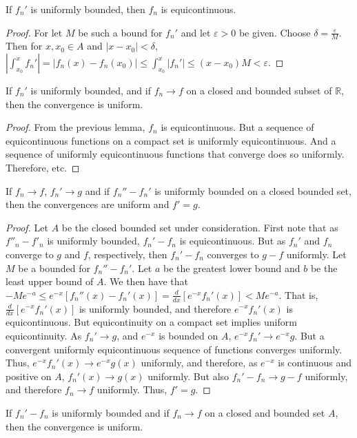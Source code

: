 \documentclass[crop=false,class=book]{standalone}
\begin{document}
\begin{lemma}
If $f_n'$ is uniformly bounded, then $f_n$ is equicontinuous.
\end{lemma}
\begin{proof}
For let $M$ be such a bound for $f_n'$ and let $\varepsilon>0$ be given. Choose $\delta = \frac{\varepsilon}{M}$. Then for $x,x_0\in A$ and $|x-x_0|<\delta$, $|\int_{x_0}^{x}f_n'| =|f_n(x)-f_n(x_0)| \leq \int_{x_0}^{x}|f_n'| \leq (x-x_0)M < \varepsilon$.
\end{proof}
\begin{theorem}
If $f_n'$ is uniformly bounded, and if $f_n \rightarrow f$ on a closed and bounded subset of $\mathbb{R}$, then the convergence is uniform.
\end{theorem}
\begin{proof}
From the previous lemma, $f_n$ is equicontinuous. But a sequence of equicontinuous functions on a compact set is uniformly equicontinuous. And a sequence of uniformly equicontinuous functions that converge does so uniformly. Therefore, etc.
\end{proof}
\begin{theorem}
If $f_n \rightarrow f$, $f_n'\rightarrow g$ and if $f_n''-f_n'$ is uniformly bounded on a closed bounded set, then the convergences are uniform and $f' = g$.
\end{theorem}
\begin{proof}
Let $A$ be the closed bounded set under consideration. First note that as $f''_n - f'_n$ is uniformly bounded, $f_n'-f_n$ is equicontinuous. But as $f_n'$ and $f_n$ converge to $g$ and $f$, respectively, then $f_n'-f_n$ converges to $g-f$ uniformly. Let $M$ be a bounded for $f_n''-f_n'$. Let $a$ be the greatest lower bound and $b$ be the least upper bound of $A$. We then have that $-Me^{-a}\leq e^{-x}[f_n''(x)-f_n'(x)]=\frac{d}{dx}[e^{-x}f_n'(x)] < Me^{-a}$. That is, $\frac{d}{dx}[e^{-x}f_n'(x)]$ is uniformly bounded, and therefore $e^{-x}f_n'(x)$ is equicontinuous. But equicontinuity on a compact set implies uniform equicontinuity. As $f_n'\rightarrow g$, and $e^{-x}$ is bounded on $A$, $e^{-x}f_n'\rightarrow e^{-x}g$. But a convergent uniformly equicontinuous sequence of functions converges uniformly. Thus, $e^{-x}f_n'(x) \rightarrow e^{-x}g(x)$ uniformly, and therefore, as $e^{-x}$ is continuous and positive on $A$, $f_n'(x)\rightarrow g(x)$ uniformly. But also $f_n'-f_n \rightarrow g-f$ uniformly, and therefore $f_n \rightarrow f$ uniformly. Thus, $f'=g$.
\end{proof}
\begin{corollary}
If $f_n' - f_n$ is uniformly bounded and if $f_n \rightarrow f$ on a closed and bounded set $A$, then the convergence is uniform.
\end{corollary}
\end{document}
